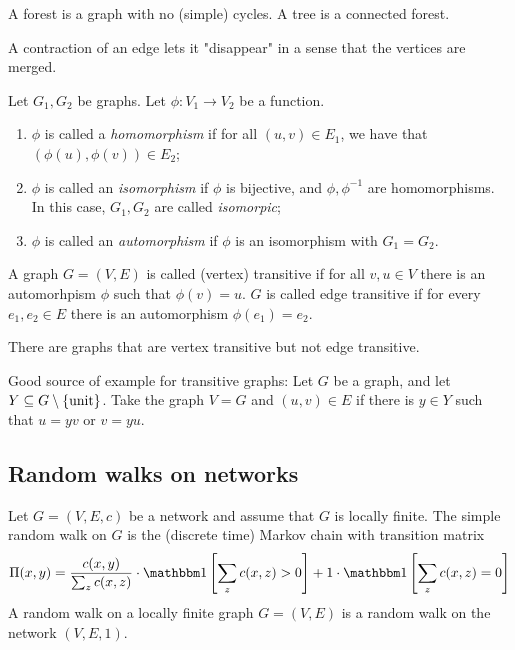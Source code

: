 \begin{defn}
    A forest is a graph with no (simple) cycles. A tree is a connected forest.
\end{defn}


\begin{remark}
    A contraction of an edge lets it "disappear" in a sense that the vertices are merged.
\end{remark}


\begin{defn}[Homomorphisms]
    Let $G_1,G_2$ be graphs. Let \(\phi: V_1 \to V_2\) be a function.
    \begin{enumerate}
      \item \(\phi\) is called a \emph{homomorphism} if for all $(u,v) \in E_1$, we have that \((\phi(u), \phi(v)) \in E_2\);
      \item \(\phi \) is called an \emph{isomorphism} if \(\phi \) is bijective, and \(\phi , {\phi }^{-1}\) are homomorphisms. In this case, \(G_1, G_2\) are called \emph{isomorpic};
      \item \(\phi \) is called an \emph{automorphism} if \(\phi \) is an isomorphism with \(G_1=G_2\).
    \end{enumerate}
\end{defn}

\begin{defn}[Transitivity]
    A graph $G=(V,E)$ is called (vertex) transitive if for all \(v,u\in V\) there is an automorhpism \(\phi\) such that \(\phi(v)=u\). $G$ is called edge transitive if for every $e_1,e_2 \in E$ there is an automorphism $\phi(e_1)=e_2$.
\end{defn}

\begin{remark}
    There are graphs that are vertex transitive but not edge transitive.
\end{remark}

\begin{remark}
  Good source of example for transitive graphs: Let $G$ be a graph, and let $Y \subseteq G\setminus\left\{ {\textrm{unit}} \right\}$. Take the graph $V=G$ and $(u,v) \in E$ if there is $y\in Y$ such that $u=yv$ or $v=yu$.
\end{remark}


\subsection{Random walks on networks}

\begin{defn}
Let $G=(V,E,c)$ be a network and assume that $G$ is locally finite. The simple random walk on $G$ is the (discrete time) Markov chain with transition matrix
\[\Pi(x,y) = \frac{c(x,y)}{\sum_z c(x,z)} \cdot \ONE\left[\sum_z c(x,z) >0\right] + 1 \cdot \ONE\left[\sum_z c(x,z)=0\right] \]
A random walk on a locally finite graph $G=(V,E)$ is a random walk on the network $(V,E,1)$.
\end{defn}


